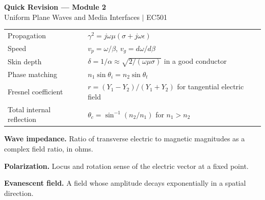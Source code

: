 \documentclass[12pt,a4paper]{article}
\renewcommand{\arraystretch}{1.45}
\begin{document}
\newpage
\begin{center}
  {\large\bfseries\color{myred} Quick Revision --- Module 2}\\[3pt]
  {\small\color{mydark} Uniform Plane Waves and Media Interfaces $|$ EC501}
\end{center}
\noindent{\color{myred}\rule{\linewidth}{1.2pt}}
\begin{tcolorbox}[formulabox,title={Key Formulas at a Glance}]
\renewcommand{\arraystretch}{1.35}
\begin{tabularx}{\linewidth}{B{5.0cm}Y}
Propagation & $\gamma^2=j\omega\mu(\sigma+j\omega\epsilon)$ \\[3pt]
Speed & $v_p=\omega/\beta$, $v_g=d\omega/d\beta$ \\[3pt]
Skin depth & $\delta=1/\alpha\approx\sqrt{2/(\omega\mu\sigma)}$ in a good conductor \\[3pt]
Phase matching & $n_1\sin\theta_i=n_2\sin\theta_t$ \\[3pt]
Fresnel coefficient & $r=(Y_1-Y_2)/(Y_1+Y_2)$ for tangential electric field \\[3pt]
Total internal reflection & $\theta_c=\sin^{-1}(n_2/n_1)$ for $n_1>n_2$ \\[3pt]
\end{tabularx}
\end{tcolorbox}
\begin{tcolorbox}[defbox,title={One-Line Definitions}]
\textbf{Wave impedance.} Ratio of transverse electric to magnetic magnitudes as a complex field ratio, in ohms.\par
\textbf{Polarization.} Locus and rotation sense of the electric vector at a fixed point.\par
\textbf{Evanescent field.} A field whose amplitude decays exponentially in a spatial direction.\par
\end{tcolorbox}
\end{document}
